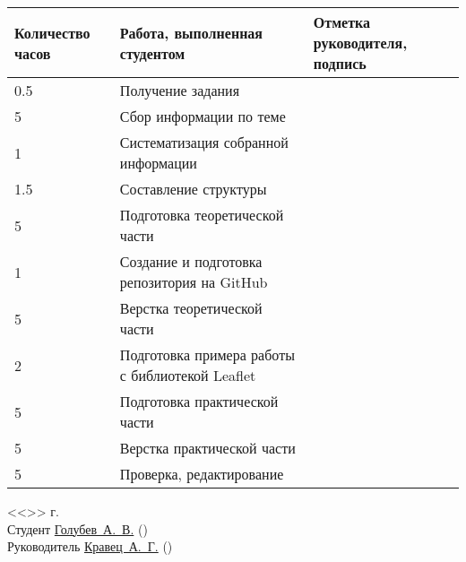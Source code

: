 \documentclass[a4paper, 14pt]{extreport}
\begin{document}
    \begin{table}[h!]
        \centering
        \begin{tabular}{|m{}|m{}|m{}|}
        \hline
        Количество часов & Работа, выполненная студентом & Отметка руководителя, подпись \\ \hline
        0.5 & Получение задания & \\ \hline
        5 & Сбор информации по теме & \\ \hline
        1 & Систематизация собранной информации & \\ \hline
        1.5 & Составление структуры & \\ \hline
        5 & Подготовка теоретической части & \\ \hline
        1 & Создание и подготовка репозитория на GitHub & \\ \hline
        5 & Верстка теоретической части & \\ \hline
        2 & Подготовка примера работы с библиотекой Leaflet & \\ \hline
        5 & Подготовка практической части & \\ \hline
        5 & Верстка практической части & \\ \hline
        5 & Проверка, редактирование & \\ \hline
        \end{tabular}
    \end{table}
    \pagestyle{empty}
    \vspace{\fill}
    \noindent<<\underline{\hspace{1cm}}>> \underline{\hspace{5cm}} \the\year г.\\
    Студент \hspace{1cm} \underline{Голубев~А.~В.\hspace{3.2cm}} \hspace{2cm} (\underline{\hspace{5cm}})\\
    Руководитель \underline{Кравец~А.~Г.\hspace{3.45cm}} \hspace{2cm} (\underline{\hspace{5cm}})\\
\end{document}
